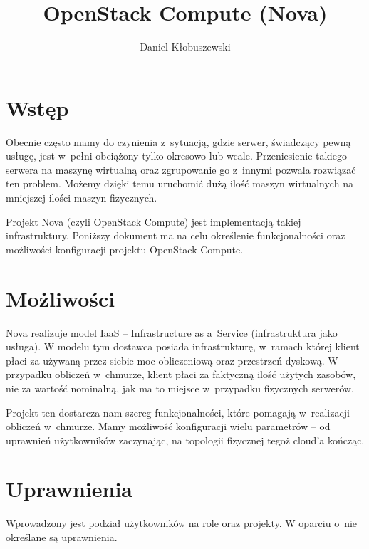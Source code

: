 

\usepackage{microtype}


\title{OpenStack Compute (Nova)\\[1em]
\large \sc {}}
\author{Daniel Kłobuszewski}


\maketitle

\section{Wstęp}
Obecnie często mamy do czynienia z~sytuacją, gdzie serwer, świadczący pewną usługę, jest w~pełni obciążony tylko okresowo lub wcale. Przeniesienie takiego serwera na maszynę wirtualną oraz zgrupowanie go z~innymi pozwala rozwiązać ten problem. Możemy dzięki temu uruchomić dużą ilość maszyn wirtualnych na mniejszej ilości maszyn fizycznych.

Projekt Nova (czyli OpenStack Compute) jest implementacją takiej infrastruktury. Poniższy dokument ma na celu określenie funkcjonalności oraz możliwości konfiguracji projektu OpenStack Compute.

\section{Możliwości}
Nova realizuje model IaaS -- Infrastructure as a~Service (infrastruktura jako usługa). W modelu tym dostawca posiada infrastrukturę, w~ramach której klient płaci za używaną przez siebie moc obliczeniową oraz przestrzeń dyskową. W przypadku obliczeń w~chmurze, klient płaci za faktyczną ilość użytych zasobów\cite{hansen11}, nie za wartość nominalną, jak ma to miejsce w~przypadku fizycznych serwerów. 

Projekt ten dostarcza nam szereg funkcjonalności, które pomagają w~realizacji obliczeń w~chmurze. Mamy możliwość konfiguracji wielu parametrów -- od uprawnień użytkowników zaczynając, na topologii fizycznej tegoż cloud'a kończąc.

\section{Uprawnienia}

Wprowadzony jest podział użytkowników na role oraz projekty. W oparciu o~nie określane są uprawnienia.

